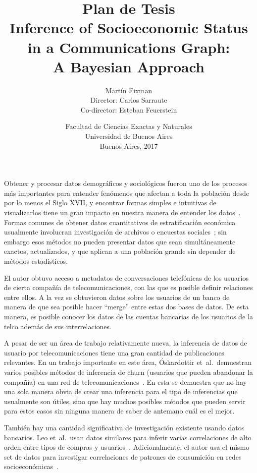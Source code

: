 \documentclass{article}
\title{Plan de Tesis\\\vspace{1em}\Large Inference of Socioeconomic Status\\in a Communications Graph:\\A Bayesian Approach}
\author{{\Large Martín Fixman}\\Director: Carlos Sarraute\\Co-director: Esteban Feuerstein}
\date{{\large Facultad de Ciencias Exactas y Naturales}\\{\large Universidad de Buenos Aires}\\Buenos Aires, 2017}
\begin{document}
\maketitle

\section*{}

Obtener y procesar datos demográficos y sociológicos fueron uno de los procesos más importantes para entender fenómenos que afectan a toda la población desde por lo menos el Siglo XVII, y encontrar formas simples e intuitivas de visualizarlos tiene un gran impacto en nuestra manera de entender los datos~\citep{minard1844,snow1855}. Formas comunes de obtener datos cuantitativos de estratificación económica usualmente involucran investigación de archivos o encuestas sociales~\citep{bulmer1977}; sin embargo esos métodos no pueden presentar datos que sean simultáneamente exactos, actualizados, y que aplican a una población grande sin depender de métodos estadísticos.

El autor obtuvo acceso a metadatos de conversaciones telefónicas de los usuarios de cierta compañía de telecomunicaciones, con las que es posible definir relaciones entre ellos. A la vez se obtuvieron datos sobre los usuarios de un banco de manera de que sea posible hacer ``merge'' entre estas dos bases de datos. De esta manera, es posible conocer los datos de las cuentas bancarias de los usuarios de la telco además de sus interrelaciones.

A pesar de ser un área de trabajo relativamente nueva, la inferencia de datos de usuario por telecomunicaciones tiene una gran cantidad de publicaciones relevantes. En un trabajo importante en este área, Óskardottir et~al.\ demuestran varios posibles métodos de inferencia de churn (usuarios que pueden abandonar la compañía) en una red de telecomunicaciones~\cite{oskardottir2016}. En esta se demuestra que no hay una sola manera obvia de crear una inferencia para el tipo de inferencias que usualmente son útiles, sino que hay muchos posibles métodos que pueden servir para estos casos sin ninguna manera de saber de antemano cuál es el mejor.

También hay una cantidad significativa de investigación existente usando datos bancarios. Leo et~al.\ usan datos similares para inferir varias correlaciones de alto orden entre tipos de compras y usuarios~\cite{leo2015socioeconomic}. Adicionalmente, el autor usa el mismo set de datos para investigar correlaciones de patrones de consumición en redes socioeconómicas~\cite{leo16correlations}.
\end{document}
